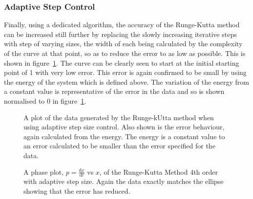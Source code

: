 \documentclass[11pt]{article} %
\newcommand{\inputTikZ}[1]{%
	}
\newcommand{\inputTikZ}[1]{%
		\beginpgfgraphicnamed{#1-external}%
		\endpgfgraphicnamed%
	}
\newcommand{\dx}[2]{\frac{\textrm{d} #1}{\textrm{d} #2}} %
\begin{document}
\subsubsection{Adaptive Step Control}
Finally, using a dedicated algorithm, the accuracy of the Runge-Kutta method can be increased still further by replacing the slowly increasing iterative steps with step of varying sizes, the width of each being calculated by the complexity of the curve at that point, so as to reduce the error to as low as possible. This is shown in figure~\ref{fig:stepcontrol}. The curve can be clearly seen to start at the initial starting point of 1 with very low error. This error is again confirmed to be small by using the energy of the system which is defined above. The variation of the energy from a constant value is representative of the error in the data and so is shown normalised to 0 in figure~\ref{fig:stepcontrol}.
\begin{figure}[ht]
	\centering
		\inputTikZ{Graph6}
	\caption{\label{fig:stepcontrol}A plot of the data generated by the Runge-kUtta method when using adaptive step size control. Also shown is the error behaviour, again calculated from the energy. The energy is a constant value to an error calculated to be smaller than the error specified for the data.}
\end{figure}

\begin{figure}[ht]
	\centering
		\inputTikZ{Graph7}
	\caption{\label{fig:phase3}A phase plot, $p=\dx{x}{t}$ vs $x$, of the Runge-Kutta Method 4th order with adaptive step size. Again the data exactly matches the ellipse showing that the error has reduced.}
\end{figure}
\end{document}
